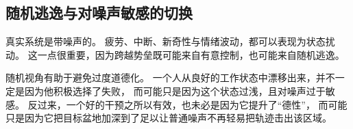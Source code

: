 \subsection{随机逃逸与对噪声敏感的切换}

真实系统是带噪声的。
疲劳、中断、新奇性与情绪波动，都可以表现为状态扰动。
这一点很重要，因为跨越势垒既可能来自有意控制，也可能来自随机逃逸。

\begin{discussion}
随机视角有助于避免过度道德化。
一个人从良好的工作状态中漂移出来，并不一定是因为他积极选择了失败，
而可能只是因为这个状态过浅，且对噪声过于敏感。
反过来，一个好的干预之所以有效，也未必是因为它提升了“德性”，
而可能只是因为它把目标盆地加深到了足以让普通噪声不再轻易把轨迹击出该区域。
\end{discussion}